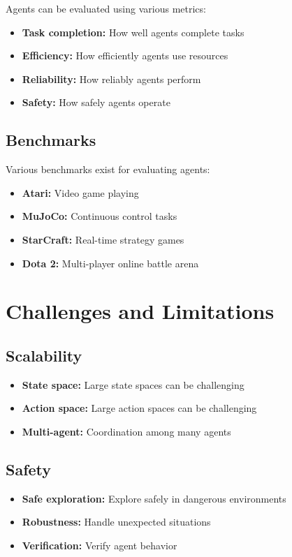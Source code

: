 Agents can be evaluated using various metrics:
\begin{itemize}
    \item \textbf{Task completion:} How well agents complete tasks
    \item \textbf{Efficiency:} How efficiently agents use resources
    \item \textbf{Reliability:} How reliably agents perform
    \item \textbf{Safety:} How safely agents operate
\end{itemize}

\subsection{Benchmarks}

Various benchmarks exist for evaluating agents:
\begin{itemize}
    \item \textbf{Atari:} Video game playing
    \item \textbf{MuJoCo:} Continuous control tasks
    \item \textbf{StarCraft:} Real-time strategy games
    \item \textbf{Dota 2:} Multi-player online battle arena
\end{itemize}

\section{Challenges and Limitations}

\subsection{Scalability}

\begin{itemize}
    \item \textbf{State space:} Large state spaces can be challenging
    \item \textbf{Action space:} Large action spaces can be challenging
    \item \textbf{Multi-agent:} Coordination among many agents
\end{itemize}

\subsection{Safety}

\begin{itemize}
    \item \textbf{Safe exploration:} Explore safely in dangerous environments
    \item \textbf{Robustness:} Handle unexpected situations
    \item \textbf{Verification:} Verify agent behavior
\end{itemize}


